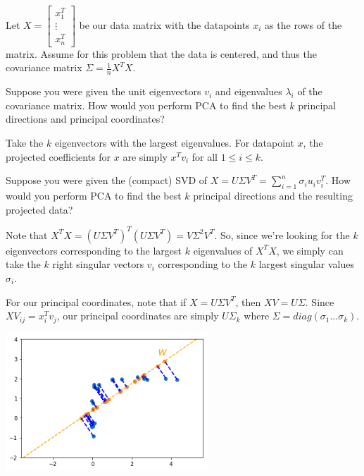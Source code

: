 
Let $X = \begin{bmatrix} x_1^T \\ \vdots \\ x_n^T \end{bmatrix}$ be our data matrix with the datapoints $x_i$ as the rows of the matrix. Assume for this problem that the data is centered, and thus the covariance matrix $\Sigma = \frac{1}{n} X^TX$.

\begin{Parts}

\Part
Suppose you were given the unit eigenvectors $v_i$ and eigenvalues $\lambda_i$ of the covariance matrix. How would you perform PCA to find the best $k$ principal directions and principal coordinates?

\begin{solution}
	Take the $k$ eigenvectors with the largest eigenvalues. For datapoint $x$, the projected coefficients for $x$ are simply $x^Tv_i$ for all $1 \leq i \leq k$.
\end{solution}

\Part
Suppose you were given the (compact) SVD of $X = U \Sigma V^T = \sum_{i=1}^n \sigma_i u_i v_i^T$. How would you perform PCA to find the best $k$ principal directions and the resulting projected data?

\begin{solution}
	Note that $X^TX = (U\Sigma V^T)^T(U\Sigma V^T) = V\Sigma^2V^T$. So, since we're looking for the $k$ eigenvectors corresponding to the largest $k$ eigenvalues of $X^TX$, we simply can take the $k$ right singular vectors $v_i$ corresponding to the $k$ largest singular values $\sigma_i$.

	For our principal coordinates, note that if $X = U \Sigma V^T$, then $XV = U \Sigma$. Since $XV_{ij} = x_i^Tv_j$, our principal coordinates are simply $U\Sigma_k$ where $\Sigma = diag(\sigma_1 \ldots \sigma_k)$.
\end{solution}

\includegraphics[width=3in]{"src/problems/pca/max_variance"}


\end{Parts}
